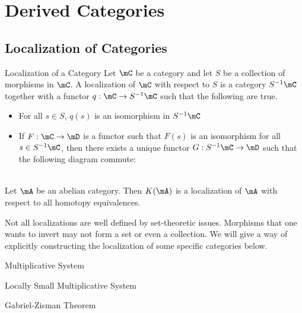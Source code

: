 \documentclass[a4paper]{article}
\begin{document}
\pagebreak
\section{Derived Categories}
\subsection{Localization of Categories}
\begin{defn}{Localization of a Category}{} Let $\mC$ be a category and let $S$ be a collection of morphisms in $\mC$. A localization of $\mC$ with respect to $S$ is a category $S^{-1}\mC$ together with a functor $q:\mC\to S^{-1}\mC$ such that the following are true. 
\begin{itemize}
\item For all $s\in S$, $q(s)$ is an isomorphism in $S^{-1}\mC$
\item If $F:\mC\to\mD$ is a functor such that $F(s)$ is an isomorphism for all $s\in S^{-1}\mC$, then there exists a unique functor $G:S^{-1}\mC\to\mD$ such that the following diagram commute: \\~\\
\end{itemize}
\end{defn}

\begin{lmm}{}{} Let $\mA$ be an abelian category. Then $K(\mA)$ is a localization of $\mA$ with respect to all homotopy equivalences. 
\end{lmm}

Not all localizations are well defined by set-theoretic issues. Morphisms that one wants to invert may not form a set or even a collection. We will give a way of explicitly constructing the localization of some specific categories below. 

\begin{defn}{Multiplicative System}{}
\end{defn}

\begin{defn}{Locally Small Multiplicative System}{}
\end{defn}

\begin{thm}{Gabriel-Zisman Theorem}{}
\end{thm}
\end{document}
